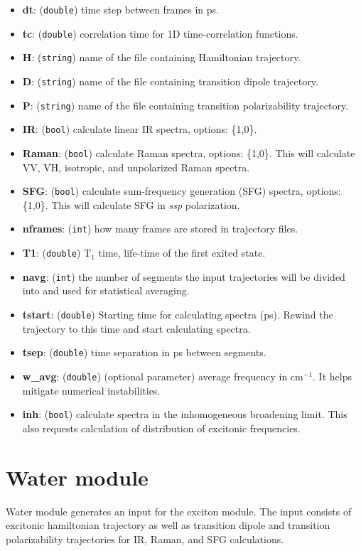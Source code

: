 \documentclass{article}
\begin{document}
\begin{itemize}
\item \textbf{dt}: (\texttt{double}) time step between frames in ps.
\item \textbf{tc}: (\texttt{double}) correlation time for 1D time-correlation functions.
\item \textbf{H}: (\texttt{string}) name of the file containing Hamiltonian trajectory. 
\item \textbf{D}: (\texttt{string}) name of the file containing transition dipole trajectory. 
\item \textbf{P}: (\texttt{string}) name of the file containing transition polarizability trajectory. 
\item \textbf{IR}: (\texttt{bool}) calculate linear IR spectra, options: \{1,0\}.
\item \textbf{Raman}: (\texttt{bool}) calculate Raman spectra, options: \{1,0\}. This will calculate VV, VH, isotropic, and unpolarized Raman spectra.
\item \textbf{SFG}: (\texttt{bool}) calculate sum-frequency generation (SFG) spectra, options: \{1,0\}. This will calculate SFG in \textit{ssp} polarization.
\item \textbf{nframes}: (\texttt{int}) how many frames are stored in trajectory files.
\item \textbf{T1}: (\texttt{double}) T$_1$ time, life-time of the first exited state.
\item \textbf{navg}: (\texttt{int}) the number of segments the input trajectories will be divided into and used for statistical averaging.
\item \textbf{tstart}: (\texttt{double}) Starting time for calculating spectra (ps). Rewind the trajectory to this time and start calculating spectra. 
\item \textbf{tsep}: (\texttt{double}) time separation in ps between segments.
\item \textbf{w\_avg}: (\texttt{double}) (optional parameter) average frequency  in cm$^{-1}$. It helps mitigate numerical instabilities.
\item \textbf{inh}: (\texttt{bool}) calculate spectra in the inhomogeneous broadening limit. This also requests
calculation of distribution of excitonic frequencies.

\end{itemize}

\section{Water module}
Water module generates an input for the exciton module. The input consists of excitonic hamiltonian trajectory as well as 
transition dipole and transition polarizability trajectories for IR, Raman, and SFG calculations.
\end{document}
